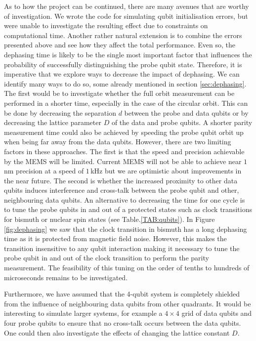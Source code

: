 As to how the project can be continued, there are many avenues that are worthy of investigation. We wrote the code for simulating qubit initialisation errors, but were unable to investigate the resulting effect due to constraints on computational time. Another rather natural extension is to combine the errors presented above and see how they affect the total performance. Even so, the dephasing time is likely to be the single most important factor that influences the probability of successfully distinguishing the probe qubit state. Therefore, it is imperative that we explore ways to decrease the impact of dephasing. We can identify many ways to do so, some already mentioned in section \ref{sec:dephasing}. The first would be to investigate whether the full orbit measurement can be performed in a shorter time, especially in the case of the circular orbit. This can be done by decreasing the separation $d$ between the probe and data qubits or by decreasing the lattice parameter $D$ of the data and probe qubits. A shorter parity measurement time could also be achieved by speeding the probe qubit orbit up when being far away from the data qubits. 
However, there are two limiting factors in these approaches. The first is that the speed and precision achievable by the MEMS will be limited. Current MEMS will not be able to achieve near $1\, $nm precision at a speed of $1\, $kHz \cite{Koo2012,Chu2003} but we are optimistic about improvements in the near future. The second is whether the increased proximity to other data qubits induces interference and cross-talk between the probe qubit and other, neighbouring data qubits. 
An alternative to decreasing the time for one cycle is to tune the probe qubits in and out of a protected states such as clock transitions for bismuth or nuclear spin states (see Table.\@ \ref{TAB:qubits}). In Figure \ref{fig:dephasing} we saw that the clock transition in bismuth has a long dephasing time as it is protected from magnetic field noise. However, this makes the transition insensitive to any qubit interaction making it necessary to tune the probe qubit in and out of the clock transition to perform the parity measurement. The feasibility of this tuning on the order of tenths to hundreds of microseconds remains to be investigated.

Furthermore, we have assumed that the 4-qubit system is completely shielded from the influence of neighbouring data qubits from other quadrants. It would be interesting to simulate larger systems, for example a $4\times 4$ grid of data qubits and four probe qubits to ensure that no cross-talk occurs between the data qubits. One could then also investigate the effects of changing the lattice constant $D$. 

